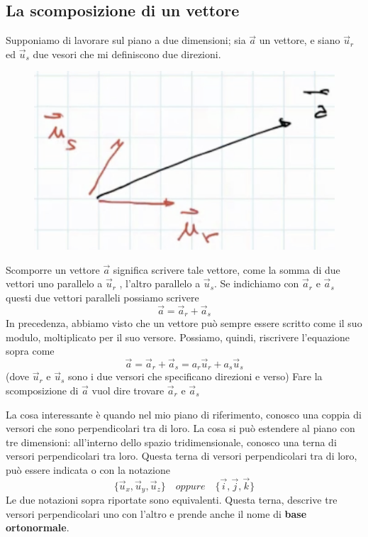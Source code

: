 \documentclass[a4paper]{book}
\begin{document}
\subsection{La scomposizione di un vettore}
Supponiamo di lavorare sul piano a due dimensioni; sia $\overrightarrow{a} $ un vettore, e siano $\overrightarrow{u}_{r}$ ed $\overrightarrow{u}_{s}$ due vesori che mi definiscono due direzioni.

\begin{figure}[h]
\begin{center}
\includegraphics[width = 0.5 \textwidth]{scomposizione1}
\label{fig:scomposizione1}
\end{center}
\end{figure}

Scomporre un vettore $\overrightarrow{a} $ significa scrivere tale vettore, come la somma di due vettori uno parallelo a $\overrightarrow{u}_{r}$ , l'altro parallelo a $\overrightarrow{u}_{s}$. Se indichiamo con $ \overrightarrow{a}_{r}$ e $ \overrightarrow{a}_{s}$ questi due vettori paralleli possiamo scrivere
$$ \overrightarrow{a} = \overrightarrow{a}_{r} + \overrightarrow{a}_{s} $$
In precedenza, abbiamo visto che un vettore può sempre essere scritto come il suo modulo, moltiplicato per il suo versore. Possiamo, quindi, riscrivere l'equazione sopra come
$$ \overrightarrow{a} = \overrightarrow{a}_{r} + \overrightarrow{a}_{s} = a_{r}\overrightarrow{u}_{r} + a_{s}\overrightarrow{u}_{s} $$ (dove $ \overrightarrow{u}_{r} $ e  $ \overrightarrow{u}_{s} $ sono i due versori che specificano direzioni e verso)
Fare la scomposizione di $\overrightarrow{a}$ vuol dire trovare $ \overrightarrow{a}_{r} $ e $ \overrightarrow{a}_{s} $

La cosa interessante è quando nel mio piano di riferimento, conosco una coppia di versori che sono perpendicolari tra di loro. La cosa si può estendere al piano con tre dimensioni: all'interno dello spazio tridimensionale, conosco una terna di versori perpendicolari tra loro. 
Questa terna di versori perpendicolari tra di loro, può essere indicata o con la notazione $$\lbrace\overrightarrow{u}_{x}, \overrightarrow{u}_{y},  \overrightarrow{u}_{z}\rbrace \quad oppure \quad \lbrace \overrightarrow{i}, \overrightarrow{j}, \overrightarrow{k}\rbrace $$
Le due notazioni sopra riportate sono equivalenti.
Questa terna, descrive tre versori perpendicolari uno con l'altro e prende anche il nome di \textbf{base ortonormale}.
\end{document}
